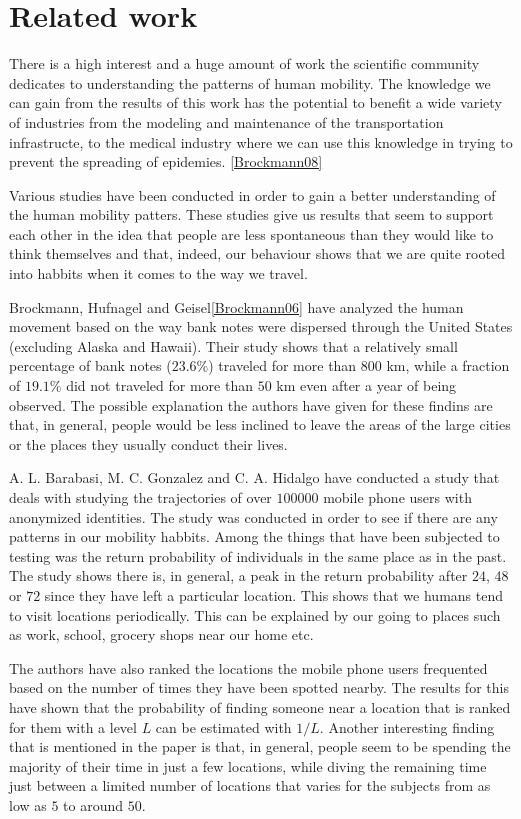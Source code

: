 \chapter{Related work}

There is a high interest and a huge amount of work the scientific community
dedicates to understanding the patterns of human mobility. The knowledge we
can gain from the results of this work has the potential to benefit a wide
variety of industries from the modeling and maintenance of the transportation infrastructe,
to the medical industry where we can use this knowledge in trying to prevent the
spreading of epidemies. \ref{Brockmann08} %

Various studies have been conducted in order to gain a better understanding of
the human mobility patters. These studies give us results that seem to support
each other in the idea that people are less spontaneous than they would like to
think themselves and that, indeed, our behaviour shows that we are quite rooted
into habbits when it comes to the way we travel.

Brockmann, Hufnagel and Geisel\ref{Brockmann06} have
analyzed the human movement based on the way bank notes were dispersed through
the United States (excluding Alaska and Hawaii). Their study shows that a
relatively small percentage of bank notes ($23.6\%$) traveled for more than
$800$ km, while a fraction of $19.1\%$ did not traveled for more than $50$ km
even after a year of being observed. The possible explanation the authors have
given for these findins are that, in general, people would be less inclined to
leave the areas of the large cities or the places they usually conduct their
lives.

A. L. Barabasi, M. C. Gonzalez and C. A. Hidalgo have conducted a study that
deals with studying the trajectories of over $100000$ mobile phone users with
anonymized identities. The study was conducted in order to see if there are any
patterns in our mobility habbits. Among the things that have been subjected to
testing was the return probability of individuals in the same place as in the
past. The study shows there is, in general, a peak in the return probability
after $24$, $48$ or $72$ since they have left a particular location. This shows
that we humans tend to visit locations periodically. This can be explained by
our going to places such as work, school, grocery shops near our home etc.

The authors have also ranked the locations the mobile phone users frequented
based on the number of times they have been spotted nearby. The results for this
have shown that the probability of finding someone near a location that is
ranked for them with a level $L$ can be estimated with $1/L$. Another
interesting finding that is mentioned in the paper is that, in general, people
seem to be spending the majority of their time in just a few locations, while
diving the remaining time just between a limited number of locations that varies
for the subjects from as low as $5$ to around $50$.


